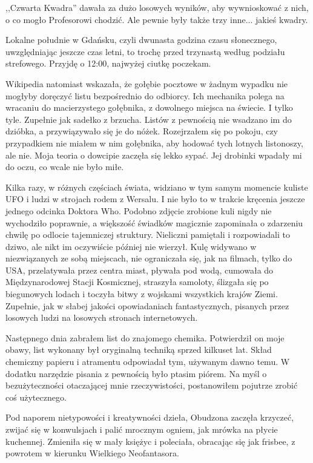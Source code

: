 ,,Czwarta Kwadra'' dawała za dużo losowych wyników, aby wywnioskować z nich, o co mogło Profesorowi chodzić.
Ale pewnie były także trzy inne... jakieś kwadry.

Lokalne południe w Gdańsku, czyli dwunasta godzina czasu słonecznego, uwzględniając jeszcze czas letni, to trochę przed trzynastą według podziału strefowego.
Przyjdę o 12:00, najwyżej ciutkę poczekam.

Wikipedia natomiast wskazała, że gołębie pocztowe w żadnym wypadku nie mogłyby doręczyć listu bezpośrednio do odbiorcy.
Ich mechanika polega na wracaniu do macierzystego gołębnika, z dowolnego miejsca na świecie. I tylko tyle. Zupełnie jak sadełko z brzucha.
Listów z pewnością nie wsadzano im do dzióbka, a przywiązywało się je do nóżek.
Rozejrzałem się po pokoju, czy przypadkiem nie miałem w nim gołębnika, aby hodować tych lotnych listonoszy, ale nie.
Moja teoria o dowcipie zaczęła się lekko sypać. Jej drobinki wpadały mi do oczu, co wcale nie było miłe.

Kilka razy, w różnych częściach świata, widziano w tym samym momencie kuliste UFO i ludzi w strojach rodem z Wersalu. I nie było to w trakcie kręcenia jeszcze jednego odcinka Doktora Who.
Podobno zdjęcie zrobione kuli nigdy nie wychodziło poprawnie, a większość świadków magicznie zapominała o zdarzeniu chwilę po odlocie tajemniczej struktury.
Nieliczni pamiętali i rozpowiadali to dziwo, ale nikt im oczywiście później nie wierzył.
Kulę widywano w niezwiązanych ze sobą miejscach, nie ograniczała się, jak na filmach, tylko do USA, przelatywała przez centra miast, pływała pod wodą, cumowała do Międzynarodowej Stacji Kosmicznej, straszyła samoloty, ślizgała się po biegunowych lodach i toczyła bitwy z wojskami wszystkich krajów Ziemi. 
Zupełnie, jak w słabej jakości opowiadaniach fantastycznych, pisanych przez losowych ludzi na losowych stronach internetowych. 

Następnego dnia zabrałem list do znajomego chemika.
Potwierdził on moje obawy, list wykonany był oryginalną techniką sprzed kilkuset lat.
Skład chemiczny papieru i atramentu odpowiadał tym, używanym dawno temu.
W dodatku narzędzie pisania z pewnością było ptasim piórem.
Na myśl o bezużyteczności otaczającej mnie rzeczywistości, postanowiłem pojutrze zrobić coś użytecznego.

\divider{}

Pod naporem nietypowości i kreatywności dzieła, Obudzona zaczęła krzyczeć, zwijać się w konwulsjach i palić mrocznym ogniem, jak mrówka na płycie kuchennej.
Zmieniła się w mały księżyc i poleciała, obracając się jak frisbee, z powrotem w kierunku Wielkiego Neofantasora.

